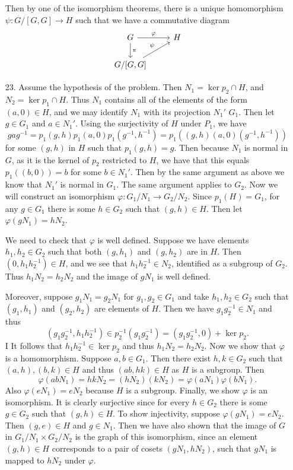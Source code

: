 \documentclass[11pt, reqno]{article}
\theoremstyle{plain}
\theoremstyle{definition}
\theoremstyle{remark}
\renewcommand{\phi}{\varphi}
\begin{document}
\begin{enumerate}
    Then by one of the isomorphism theorems, there is a unique homomorphism $\psi: G/[G,G] \rightarrow H$ such
    that we have a commutative diagram
    \begin{equation*}
        \begin{tikzcd}
            G \arrow[d, "\pi"] \arrow[r,"\phi"] & H \\
            G/[G,G] \arrow[ur, "\psi"]
        \end{tikzcd}
    \end{equation*}

    \item[23.] Assume the hypothesis of the problem. Then $N_1 = \ker p_2 \cap H$, and $N_2 = \ker p_1 \cap H$.
    Thus $N_1$ contains all of the elements of the form $(a,0) \in H$, and we may identify $N_1$ 
    with its projection $N_1'$ $G_1$. Then let $g \in G_1$ and $a \in N_1'$. Using the surjectivity of 
    $H$ under $P_1$, we have
    \[
        gag^{-1} = p_1(g,h)p_1(a,0)p_1(g^{-1},h^{-1}) = p_1((g,h)(a,0)(g^{-1},h^{-1}))
    \]
    for some $(g,h)$ in $H$ such that $p_1(g,h) = g$. Then because $N_1$ is normal in $G$, as it 
    is the kernel of $p_2$ restricted to $H$, we have that this equals $p_1((b,0)) = b$ for 
    some $b \in N_1'$. Then by the same argument as above we know that $N_1'$ is normal in $G_1$. 
    The same argument applies to $G_2$.
    \bigbreak
    Now we will construct an isomorphism $\phi: G_1/N_1 \rightarrow G_2/N_2$. Since $p_1(H) = G_1$, 
    for any $g \in G_1$ there is some $h \in G_2$ such that $(g,h) \in H$. Then let $\phi(gN_1) = hN_2$.
    
    We need to check that $\phi$ is well defined. Suppose we have elements $h_1, h_2 \in G_2$ such that
    both $(g,h_1)$ and $(g, h_2)$ are in $H$. Then $(0, h_1 h_2^{-1}) \in H$, and we see that $h_1 h_2^{-1} \in N_2$,
    identified as a subgroup of $G_2$. Thus $h_1 N_2 = h_2 N_2$ and the image of $gN_1$ is well defined.
    
    Moreover, suppose $g_1 N_1 = g_2 N_1$ for $g_1, g_2 \in G_1$ and take $h_1, h_2 \in G_2$ such that
    $(g_1, h_1)$ and $(g_2, h_2)$ are elements of $H$. Then we have $g_1 g_2^{-1} \in N_1$ and thus 
    \[
        (g_1 g_2^{-1}, h_1 h_2^{-1}) \in p_2^{-1}(g_1 g_2^{-1}) = (g_1 g_2^{-1}, 0) + \ker p_2.
    \]I
    It follows that $h_1 h_2^{-1} \in \ker p_2$ and thus $h_1 N_2 = h_2 N_2$.
    \bigbreak
    Now we show that $\phi$ is a homomorphism. Suppose $a,b \in G_1$. Then there exist $h,k \in G_2$
    such that $(a,h),(b,k) \in H$ and thus $(ab, hk) \in H$ as $H$ is a subgroup. Then 
    \[
        \phi(ab N_1) = hk N_2 = (h N_2)(k N_2) = \phi(a N_1)\phi(b N_1).
    \]
    Also $\phi(e N_1) = e N_2$ because $H$ is a subgroup. 
    \bigbreak 
    Finally, we show $\phi$ is an isomorphism. It is clearly surjective since for every $h \in G_2$ there 
    is some $g \in G_2$ such that $(g,h) \in H$. To show injectivity, suppose $\phi(g N_1) = e N_2$. Then 
    $(g, e) \in H$ and $g \in N_1$. 
    \bigbreak
    Then we have also shown that the image of $G$ in $G_1/N_1 \times G_2/N_2$ is the graph of this 
    isomorphism, since an element $(g,h) \in H$ corresponds to a pair of cosets $(gN_1, hN_2)$, 
    such that $gN_1$ is mapped to $hN_2$ under $\phi$. 


\end{enumerate}
\end{document}

